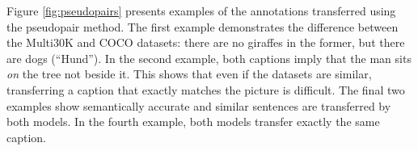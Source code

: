 Figure \ref{fig:pseudopairs} presents examples of the annotations transferred using the pseudopair method. The first example demonstrates the difference between the Multi30K and COCO datasets: there are no giraffes in the former, but there are dogs (``Hund'').  In the second example, both captions imply that the man sits \emph{on} the tree not beside it. This shows that even if the datasets are similar, transferring a caption that exactly matches the picture is difficult. The final two examples show semantically accurate and similar sentences are transferred by both models. In the fourth example, both models transfer exactly the same caption.


\begin{figure}[t]
\begin{center}

\setlength\tabcolsep{8pt}


\end{center}
\end{figure}
